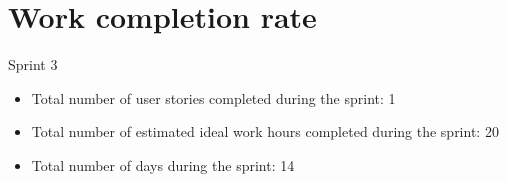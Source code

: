 \documentclass[11pt]{article}
\begin{document}
	\section{Work completion rate}
		\vspace{-3mm}
		\normalsize{Sprint 3}\\
		\vspace{-3mm}
		\begin{itemize}
			\item Total number of user stories completed during the sprint: 1
			\vspace{-3mm}
			\item Total number of estimated ideal work hours completed during the sprint: 20
			\vspace{-3mm}
			\item Total number of days during the sprint: 14
		\end{itemize}
	
\end{document}
